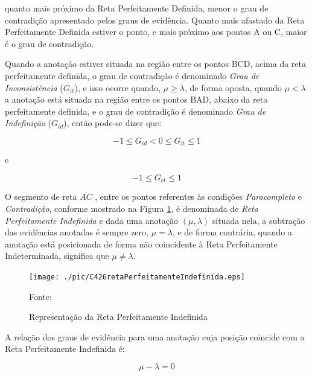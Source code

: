 quanto mais próximo da Reta Perfeitamente Definida, menor o grau de contradição apresentado pelos graus de evidência. 
Quanto mais afastado da Reta Perfeitamente Definida estiver o ponto, e mais próximo aos pontos A ou C, maior é o grau de contradição. 

Quando a anotação estiver situada na região entre os pontos BCD, acima da reta perfeitamente definida, o grau de contradição é denominado 
\emph{Grau de Inconsistência} ($G_{it}$), 
e isso ocorre quando, $\mu \ge \lambda $, de forma oposta, quando $\mu < \lambda $ a anotação está situada na região entre os pontos BAD, abaixo da reta perfeitamente definida, e o grau de contradição é denominado 
\emph{Grau de Indefinição} ($G_{id}$), 
então pode-se dizer que:

\begin{center}
\begin{equation}
-1 \le G _{id}  <  0 \le G _{it} \le 1
\label{eq:grauInconsistenciaIndefinicao}
\end{equation}
\end{center}
e
\begin{center}
\begin{equation}
-1 \le G _{ct} \le 1
\label{eq:grauInconsistenciaIndefinicao1}
\end{equation}
\end{center}


O segmento de reta $\overline{ AC }$ , entre os pontos referentes às condições \emph{Paracompleto} e \emph{Contradição}, conforme mostrado na Figura \ref{fig:retaPerfeitamenteIndefinida}, é denominada de \emph{Reta Perfeitamente Indefinida} e dada uma anotação $(\mu, \lambda )$ situada nela, a subtração das evidências anotadas é sempre zero, $\mu = \lambda$, e de forma contrária, quando a anotação está posicionada de forma não coincidente à Reta Perfeitamente Indeterminada, significa que $\mu \neq \lambda$.

\begin{figure}[!htb]
\centering
\caption{Representação da Reta Perfeitamente Indefinida}
\center\texttt{[image: ./pic/C426retaPerfeitamenteIndefinida.eps]}
\label{fig:retaPerfeitamenteIndefinida}

{\small Fonte: \cite{JoaoInacio}}
\end{figure}

A relação dos graus de evidência para uma anotação cuja posição coincide com a Reta Perfeitamente Indefinida é: 

\begin{center}
\begin{equation}
\mu - \lambda = 0
\label{eq:evidenciaIndefinida}
\end{equation}
\end{center}

